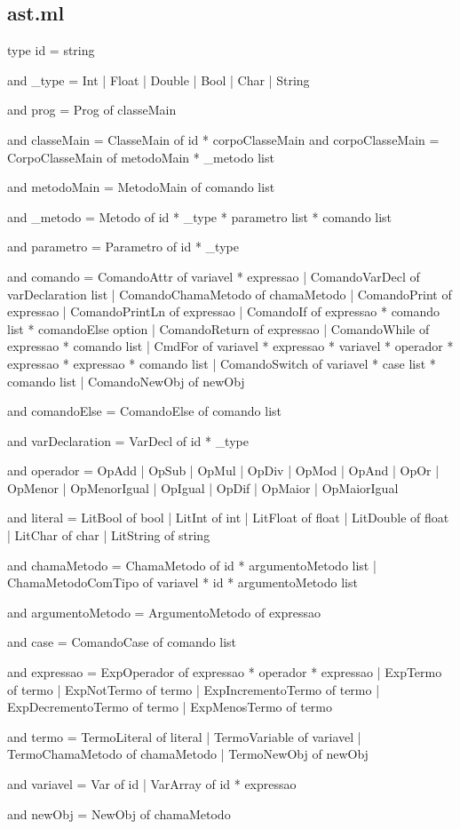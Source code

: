 \documentclass[12pt,a4paper,twoside]{report}
\begin{document}
\subsection{ast.ml}
\begin{terminal}
type id = string

and _type = 
	  Int
	| Float
	| Double
	| Bool
	| Char
	| String

and prog = 
	Prog of classeMain

and classeMain = 
	ClasseMain of id * corpoClasseMain
and corpoClasseMain = 
	CorpoClasseMain of metodoMain * _metodo list

and metodoMain = 
	MetodoMain of comando list

and _metodo = 
	Metodo of id * _type * parametro list * comando list

and parametro = 
	Parametro of id * _type


and comando = 
	  ComandoAttr of variavel * expressao
    | ComandoVarDecl of varDeclaration list
    | ComandoChamaMetodo of chamaMetodo
    | ComandoPrint of expressao
    | ComandoPrintLn of expressao
    | ComandoIf of expressao * comando list * comandoElse option
    | ComandoReturn of expressao
    | ComandoWhile of expressao * comando list
    | CmdFor of variavel * expressao * variavel * operador * expressao * expressao * comando list
    | ComandoSwitch of variavel * case list * comando list
    | ComandoNewObj of newObj



and comandoElse = 
	  ComandoElse of comando list

and varDeclaration =
	VarDecl of id * _type

and operador =
	  OpAdd
    | OpSub
    | OpMul
    | OpDiv
    | OpMod
    | OpAnd
    | OpOr
    | OpMenor
    | OpMenorIgual
    | OpIgual
    | OpDif
    | OpMaior
    | OpMaiorIgual

and literal =
      LitBool of bool
    | LitInt of int
    | LitFloat of float
    | LitDouble of float
    | LitChar of char
    | LitString of string


and chamaMetodo = 
	  ChamaMetodo of id * argumentoMetodo list
	| ChamaMetodoComTipo of variavel * id * argumentoMetodo list

and argumentoMetodo = 
	ArgumentoMetodo of expressao 

and case =
    ComandoCase of comando list

and expressao = 
	  ExpOperador of expressao * operador * expressao
	| ExpTermo of termo
	| ExpNotTermo of termo
        | ExpIncrementoTermo of termo
        | ExpDecrementoTermo of termo
	| ExpMenosTermo of termo

and termo = 
	  TermoLiteral of literal
	| TermoVariable of variavel
	| TermoChamaMetodo of chamaMetodo
	| TermoNewObj of newObj

and variavel =
	  Var of id
	| VarArray of id * expressao

and newObj = 
	NewObj of chamaMetodo
\end{terminal}
\end{document}
